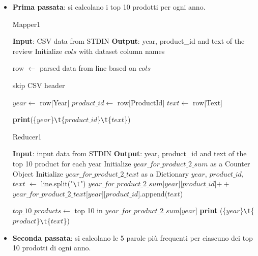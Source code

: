   \begin{itemize}
    \item \textbf{Prima passata}: si calcolano i top 10 prodotti per ogni anno.
    
    \begin{algorithm}[!ht]
    \caption{Mapper1}
      \begin{algorithmic}[1]
        \STATE \textbf{Input}: CSV data from STDIN
        \STATE \textbf{Output}: year, product\_id and text of the review
        \STATE Initialize $cols$ with dataset column names
  
        \STATE row $\gets$ parsed data from line based on $cols$
        
        \STATE skip CSV header
    
        \STATE $year \gets$ row[Year]
        \STATE $product\_id \gets$ row[ProductId]
        \STATE $text \gets$ row[Text]
        
        \STATE \textbf{print}(\{$year$\}\texttt{\textbackslash t}\{$product\_id$\}\texttt{\textbackslash t}\{$text$\})
       \ENDFOR
      \end{algorithmic}
    \end{algorithm}

    \begin{algorithm}[!ht]
      \caption{Reducer1}
      \begin{algorithmic}[1]
      \STATE \textbf{Input}: input data from STDIN
      \STATE \textbf{Output}: year, product\_id and text of the top 10 product for each year
      \STATE Initialize $year\_for\_product\_2\_sum$ as a Counter Object
      \STATE Initialize $year\_for\_product\_2\_text$ as a Dictionary
        \STATE $year$, $product\_id$, $text$ $\gets$ line.split("\texttt{\textbackslash t}")
        \STATE $year\_for\_product\_2\_sum$[$year$][$product\_id$]$++$
        \STATE $year\_for\_product\_2\_text$[$year$][$product\_id$].append($text$)
      \ENDFOR
      
        \STATE $top\_10\_products \gets$ top 10 in $year\_for\_product\_2\_sum$[$year$]
            \STATE \textbf{print} (\{$year$\}\texttt{\textbackslash t}\{$product$\}\texttt{\textbackslash t}\{$text$\})
          \ENDFOR
        \ENDFOR
      \ENDFOR
    \end{algorithmic}
    \end{algorithm}
\newpage
    \item \textbf{Seconda passata}: si calcolano le 5 parole più frequenti per ciascuno dei top 10 prodotti di ogni anno.
    

\end{itemize}
